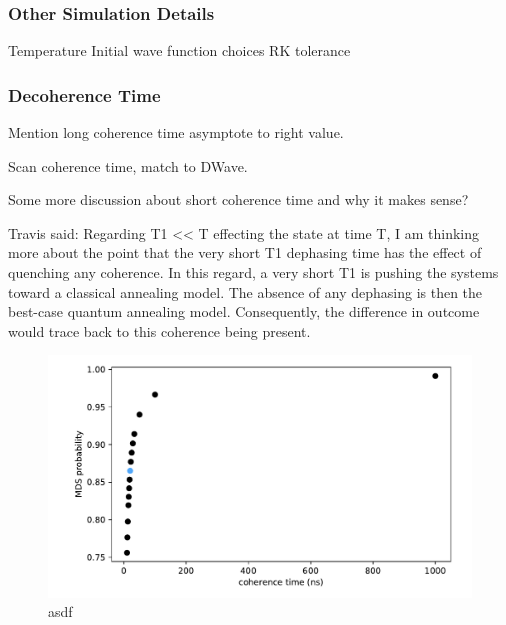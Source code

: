 \documentclass[prd,twocolumn,tightenlines,preprintnumbers,showpacs,superscriptaddress,notitlepage,nofootinbib,eqsecnum,floatfix,longbibliography]{revtex4}
\begin{document}
\subsubsection{Other Simulation Details}
Temperature
Initial wave function choices
RK tolerance

\subsubsection{Decoherence Time}
\label{sec:methods:deco}

Mention long coherence time asymptote to right value.

Scan coherence time, match to DWave.

Some more discussion about short coherence time and why it makes sense?

Travis said: Regarding T1 << T effecting the state at time T, I am thinking more about the point that the very short T1 dephasing time has the effect of quenching any coherence.
In this regard, a very short T1 is pushing the systems toward a classical annealing model.
The absence of any dephasing is then the best-case quantum annealing model.
Consequently, the difference in outcome would trace back to this coherence being present.

\begin{figure}
    \centering
    \includegraphics[width=\columnwidth]{./figures/coherence.pdf}
    \caption{asdf}
    \label{fig:prob_mi}
\end{figure}


\end{document}
